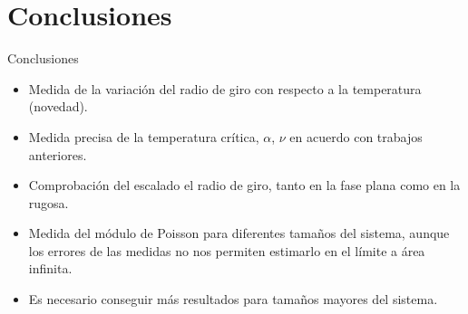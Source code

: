 \documentclass[xcolor=dvipsnames]{beamer}
\begin{document}
\section{Conclusiones}
\begin{frame}{Conclusiones}
\begin{itemize}
\item Medida de la variación del radio de giro con respecto a la temperatura (novedad).
\item Medida precisa de la temperatura crítica, $\alpha$, $\nu$ en acuerdo con
  trabajos anteriores.
\item Comprobación del escalado el radio de giro, tanto en la fase plana como en la
rugosa.
\item Medida del módulo de Poisson para diferentes tamaños del sistema, aunque los
errores de las medidas no nos permiten estimarlo en el límite a área infinita.
\item Es necesario conseguir más resultados para tamaños mayores del sistema.
\end{itemize}
\end{frame}
\end{document}
